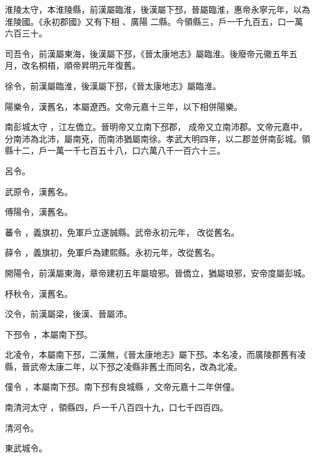 \begin{pinyinscope}
淮陵太守，本淮陵縣，前漢屬臨淮，後漢屬下邳，晉屬臨淮，惠帝永寧元年，以為淮陵國。《永初郡國》又有下相
 、廣陽
 二縣。今領縣三，戶一千九百五，口一萬六百三十。



 司吾令，前漢屬東海，後漢屬下邳，《晉太康地志》屬臨淮。後廢帝元徽五年五月，改名桐梧，順帝昇明元年復舊。



 徐令，前漢屬臨淮，後漢屬下邳，《晉太康地志》屬臨淮。



 陽樂令，漢舊名，本屬遼西。文帝元嘉十三年，以下相併陽樂。


南彭城太守
 ，江左僑立。晉明帝又立南下邳郡，
 成帝又立南沛郡。文帝元嘉中，分南沛為北沛，屬南兗，而南沛猶屬南徐。孝武大明四年，以二郡並併南彭城。領縣十二，戶一萬一千七百五十八，口六萬八千一百六十三。


呂令。



 武原令，漢舊名。



 傅陽令，漢舊名。


蕃令
 ，義旗初，免軍戶立遂誠縣。武帝永初元年，
 改從舊名。


薛令
 ，義旗初，免軍戶為建熙縣。永初元年，改從舊名。



 開陽令，前漢屬東海，章帝建初五年屬琅邪。晉僑立，猶屬琅邪，安帝度屬彭城。



 杼秋令，漢舊名。



 洨令，前漢屬梁，後漢、晉屬沛。


下邳令
 ，本屬南下邳。



 北凌令，本屬南下邳，二漢無，《晉太康地志》屬下邳。本名凌，而廣陵郡舊有凌縣，晉武帝太康二年，以下邳之凌縣非舊土而同名，改為北凌。


僮令
 ，本屬南下邳。南下邳有良城縣
 ，文帝元嘉十二年併僮。


南清河太守
 ，領縣四，戶一千八百四十九，口七千四百四。


清河令。


東武城令。



\end{pinyinscope}
